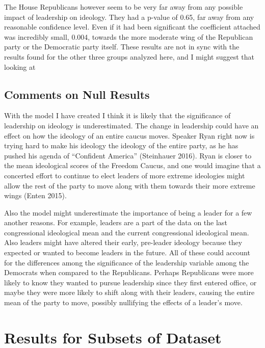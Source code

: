 \documentclass[12pt,twoside]{reedthesis}
\begin{document}
  The House Republicans however seem to be very far away from any possible
  impact of leadership on ideology. They had a p-value of 0.65, far away
  from any reasonable confidence level. Even if it had been significant
  the coefficient attached was incredibly small, 0.004, towards the more
  moderate wing of the Republican party or the Democratic party itself.
  These results are not in sync with the results found for the other three
  groups analyzed here, and I might suggest that looking at
  
  \subsection{Comments on Null Results}\label{comments-on-null-results}
  
  With the model I have created I think it is likely that the significance
  of leadership on ideology is underestimated. The change in leadership
  could have an effect on how the ideology of an entire caucus moves.
  Speaker Ryan right now is trying hard to make his ideology the ideology
  of the entire party, as he has pushed his agenda of ``Confident
  America'' (Steinhauer 2016). Ryan is closer to the mean ideological
  scores of the Freedom Caucus, and one would imagine that a concerted
  effort to continue to elect leaders of more extreme ideologies might
  allow the rest of the party to move along with them towards their more
  extreme wings (Enten 2015).
  
  Also the model might underestimate the importance of being a leader for
  a few another reasons. For example, leaders are a part of the data on
  the last congressional ideological mean and the current congressional
  ideological mean. Also leaders might have altered their early,
  pre-leader ideology because they expected or wanted to become leaders in
  the future. All of these could account for the differences among the
  significance of the leadership variable among the Democrats when
  compared to the Republicans. Perhaps Republicans were more likely to
  know they wanted to pursue leadership since they first entered office,
  or maybe they were more likely to shift along with their leaders,
  causing the entire mean of the party to move, possibly nullifying the
  effects of a leader's move.
  
  \section{Results for Subsets of
  Dataset}\label{results-for-subsets-of-dataset}
  
\end{document}
